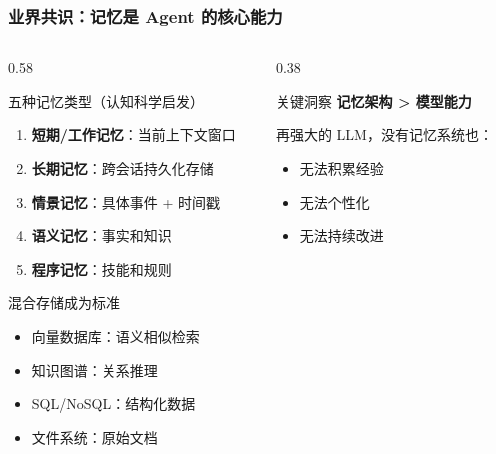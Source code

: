 \documentclass[aspectratio=169,10pt]{beamer}
\begin{document}
\begin{frame}
  \frametitle{业界共识：记忆是 Agent 的核心能力}

  \begin{columns}[T]
    \begin{column}{0.58\textwidth}
      \begin{block}{五种记忆类型（认知科学启发）}
        \footnotesize
        \begin{enumerate}
          \item \textbf{短期/工作记忆}：当前上下文窗口
          \item \textbf{长期记忆}：跨会话持久化存储
          \item \textbf{情景记忆}：具体事件 + 时间戳
          \item \textbf{语义记忆}：事实和知识
          \item \textbf{程序记忆}：技能和规则
        \end{enumerate}
      \end{block}

      \vspace{0.2cm}

      \begin{block}{混合存储成为标准}
        \footnotesize
        \begin{itemize}
          \item 向量数据库：语义相似检索
          \item 知识图谱：关系推理
          \item SQL/NoSQL：结构化数据
          \item 文件系统：原始文档
        \end{itemize}
      \end{block}
    \end{column}

    \begin{column}{0.38\textwidth}
      \begin{alertblock}{关键洞察}
        \footnotesize
        \textbf{记忆架构 > 模型能力}

        \vspace{0.2cm}

        再强大的 LLM，没有记忆系统也：
        \begin{itemize}
          \item 无法积累经验
          \item 无法个性化
          \item 无法持续改进
        \end{itemize}
      \end{alertblock}


\end{column}
\end{columns}
\end{frame}
\end{document}
